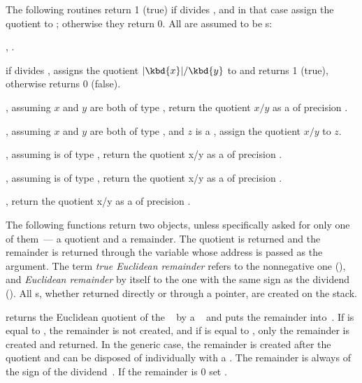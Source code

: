 The following routines return 1 (true) if  divides , and in
that case assign the quotient to ; otherwise they return 0. All
 are assumed to be s:

,
.

 if  divides , assigns
the quotient $|\kbd{x}|/\kbd{y}$ to  and returns 1 (true), otherwise
returns 0 (false).


, assuming $x$ and $y$
are both of type , return the quotient $x/y$ as a  of
precision .

, assuming $x$ and $y$
are both of type , and $z$ is a ,
assign the quotient $x/y$ to $z$.

, assuming 
is of type , return the quotient x/y as a  of
precision .

, assuming 
is of type , return the quotient x/y as a  of
precision .

, return the quotient x/y as a
 of precision .


 The following functions return two objects,
unless specifically asked for only one of them~--- a quotient and a remainder.
The quotient is returned and the remainder is returned through the variable
whose address is passed as the  argument. The term \emph{true
Euclidean remainder} refers to the nonnegative one (), and
\emph{Euclidean remainder} by itself to the one with the same sign as the
dividend (). All s, whether returned directly or through a
pointer, are created on the stack.

 returns the Euclidean quotient of the
~ by a ~ and puts the remainder
into~. If  is equal to , the remainder is not
created, and if  is equal to  , only the remainder is
created and returned. In the generic case, the remainder is created after the
quotient and can be disposed of individually with a . The
remainder is always of the sign of the dividend~. If the remainder
is $0$ set .

